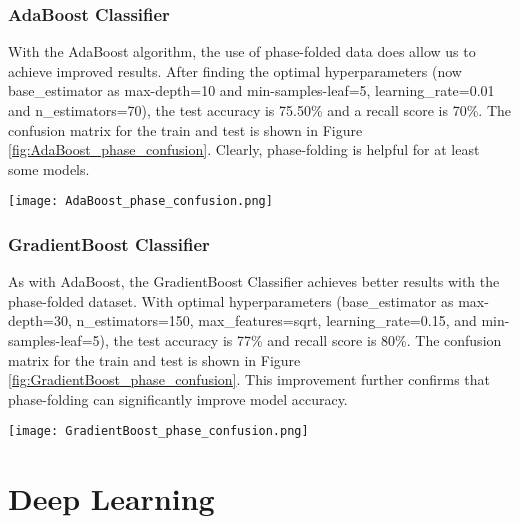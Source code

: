 \documentclass{article}
\begin{document}
\subsubsection{AdaBoost Classifier}
With the AdaBoost algorithm, the use of phase-folded data does allow us to achieve improved results. After finding the optimal hyperparameters (now base\_estimator as max-depth=10 and min-samples-leaf=5, learning\_rate=0.01 and n\_estimators=70), the test accuracy is 75.50\%  and a recall score is 70\%. The confusion matrix for the train and test is shown in Figure \ref{fig:AdaBoost_phase_confusion}. Clearly, phase-folding is helpful for at least some models. 
\begin{figure*}[ht]
\centering
\texttt{[image: AdaBoost\_phase\_confusion.png]}
\caption{A confusion matrix for our AdaBoost classifier trained on the engineered data.}
\label{fig:AdaBoost_phase_confusion}
\end{figure*}

\subsubsection{GradientBoost Classifier}
As with AdaBoost, the GradientBoost Classifier achieves better results with the phase-folded dataset. With optimal hyperparameters (base\_estimator as max-depth=30, n\_estimators=150, max\_features=sqrt, learning\_rate=0.15, and min-samples-leaf=5), the test accuracy is 77\%  and recall score is 80\%. The confusion matrix for the train and test is shown in Figure \ref{fig:GradientBoost_phase_confusion}. This improvement further confirms that phase-folding can significantly improve model accuracy. 

\begin{figure*}[ht]
\centering
\texttt{[image: GradientBoost\_phase\_confusion.png]}
\caption{A confusion matrix for our GradientBoost classifier trained on the engineered data.}
\label{fig:GradientBoost_phase_confusion}
\end{figure*}

\section{Deep Learning}
\end{document}
